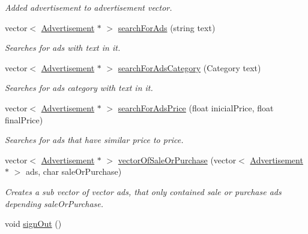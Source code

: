 \begin{DoxyCompactItemize}
\begin{DoxyCompactList}\small\item\em Added advertisement to advertisement vector. \end{DoxyCompactList}\item 
vector$<$ \hyperlink{class_advertisement}{Advertisement} $\ast$ $>$ \hyperlink{class_data_a2d154ed7f306a52f9881f28c8a05dd8d}{search\+For\+Ads} (string text)
\begin{DoxyCompactList}\small\item\em Searches for ads with text in it. \end{DoxyCompactList}\item 
vector$<$ \hyperlink{class_advertisement}{Advertisement} $\ast$ $>$ \hyperlink{class_data_a792520f278facffb963b239b8b684a15}{search\+For\+Ads\+Category} (Category text)
\begin{DoxyCompactList}\small\item\em Searches for ads category with text in it. \end{DoxyCompactList}\item 
vector$<$ \hyperlink{class_advertisement}{Advertisement} $\ast$ $>$ \hyperlink{class_data_a7f5f4489bd571f294b306547722d06ff}{search\+For\+Ads\+Price} (float inicial\+Price, float final\+Price)
\begin{DoxyCompactList}\small\item\em Searches for ads that have similar price to price. \end{DoxyCompactList}\item 
vector$<$ \hyperlink{class_advertisement}{Advertisement} $\ast$ $>$ \hyperlink{class_data_aa54b962f82cd79a35fbd916ffa36a301}{vector\+Of\+Sale\+Or\+Purchase} (vector$<$ \hyperlink{class_advertisement}{Advertisement} $\ast$ $>$ ads, char sale\+Or\+Purchase)
\begin{DoxyCompactList}\small\item\em Creates a sub vector of vector ads, that only contained sale or purchase ads depending sale\+Or\+Purchase. \end{DoxyCompactList}\item 
\hypertarget{class_data_aa360a3db988286931e07793bcb179f81}{}void \hyperlink{class_data_aa360a3db988286931e07793bcb179f81}{sign\+Out} ()\label{class_data_aa360a3db988286931e07793bcb179f81}


\end{DoxyCompactItemize}
